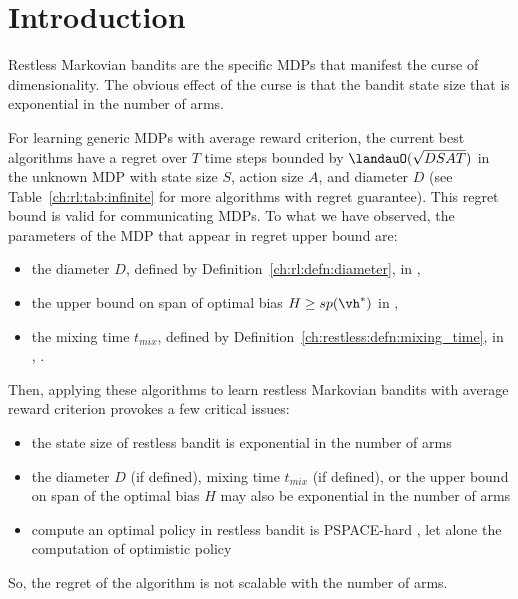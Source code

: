 \section{Introduction}
\label{ch:restless:related}

Restless Markovian bandits are the specific MDPs that manifest the curse of dimensionality.
The obvious effect of the curse is that the bandit state size that is exponential in the number of arms.

For learning generic MDPs with average reward criterion, the current best algorithms have a regret over $T$ time steps bounded by $\landauO(\sqrt{DSAT})$ in the unknown MDP with state size $S$, action size $A$, and diameter $D$ (see Table~\ref{ch:rl:tab:infinite} for more algorithms with regret guarantee).
This regret bound is valid for communicating MDPs.
To what we have observed, the parameters of the MDP that appear in regret upper bound are:
\begin{itemize}
    \item the diameter $D$, defined by Definition~\ref{ch:rl:defn:diameter}, in \eg, \cite{jaksch2010near, fruit2020improved, tossou2019near}
    \item the upper bound on span of optimal bias $H\ge sp(\vh^*)$ in \eg, \cite{bartlett2012regal, ouyang2017learning, fruit2018efficient, zhang2019regret}
    \item the mixing time $t_{mix}$, defined by Definition~\ref{ch:restless:defn:mixing_time}, in \eg, \cite{ortner2020regret}.
\end{itemize}
Then, applying these algorithms to learn restless Markovian bandits with average reward criterion provokes a few critical issues:
\begin{itemize}
    \item the state size of restless bandit is exponential in the number of arms
    \item the diameter $D$ (if defined), mixing time $t_{mix}$ (if defined), or the upper bound on span of the optimal bias $H$ may also be exponential in the number of arms
    \item compute an optimal policy in restless bandit is PSPACE-hard \cite{papadimitriou1994complexity}, let alone the computation of optimistic policy
\end{itemize}
So, the regret of the algorithm is not scalable with the number of arms.

